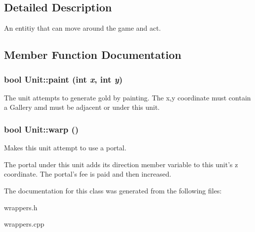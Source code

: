 \subsection{Detailed Description}
An entitiy that can move around the game and act. 

\subsection{Member Function Documentation}
\hypertarget{classUnit_766eec7dc93515b6d6590fd2c12923a6}{
\subsubsection[{paint}]{\setlength{\rightskip}{0pt plus 5cm}bool Unit::paint (int {\em x}, \/  int {\em y})}}
\label{classUnit_766eec7dc93515b6d6590fd2c12923a6}


The unit attempts to generate gold by painting. The x,y coordinate must contain a Gallery amd must be adjacent or under this unit. \hypertarget{classUnit_46e83270573c33637b588b87132c8905}{
\subsubsection[{warp}]{\setlength{\rightskip}{0pt plus 5cm}bool Unit::warp ()}}
\label{classUnit_46e83270573c33637b588b87132c8905}


Makes this unit attempt to use a portal.

The portal under this unit adds its direction member variable to this unit's z coordinate. The portal's fee is paid and then increased. 

The documentation for this class was generated from the following files:\begin{CompactItemize}
\item 
wrappers.h\item 
wrappers.cpp\end{CompactItemize}

